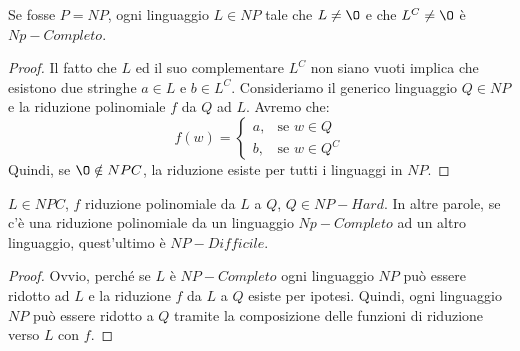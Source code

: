 \vspace{0.2cm}

\begin{lemm}
	Se fosse $P = NP$, ogni linguaggio $L \in NP$ tale che $L \neq \O$ e che $L^C \neq \O$ è $Np-Completo$.
\end{lemm}

\begin{proof}
	Il fatto che $L$ ed il suo complementare $L^C$ non siano vuoti implica che esistono due stringhe $a \in L$ e $b \in L^C$. Consideriamo il generico linguaggio $Q \in NP$ e la riduzione polinomiale $f$ da $Q$ ad $L$. Avremo che:
	$$
		f(w) = \begin{cases} a, & \mbox{se } w \in Q \\ b, & \mbox{se } w \in Q^C \end{cases}
	$$
	Quindi, se $\O \notin NPC$, la riduzione esiste per tutti i linguaggi in $NP$.
\end{proof}

\vspace{0.2cm}

\begin{lemm}
	$L \in NPC$, $f$ riduzione polinomiale da $L$ a $Q$, $Q \in NP-Hard$. In altre parole, se c'è una riduzione polinomiale da un linguaggio $Np-Completo$ ad un altro linguaggio, quest'ultimo è $NP-Difficile$.
\end{lemm}

\begin{proof}
	Ovvio, perché se $L$ è $NP-Completo$ ogni linguaggio $NP$ può essere ridotto ad $L$ e la riduzione $f$ da $L$ a $Q$ esiste per ipotesi. Quindi, ogni linguaggio $NP$ può essere ridotto a $Q$ tramite la composizione delle funzioni di riduzione verso $L$ con $f$.
\end{proof}
